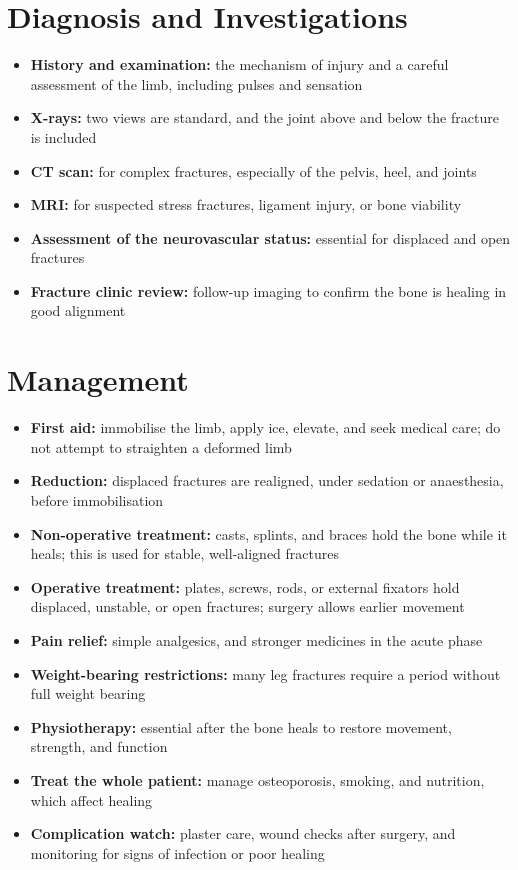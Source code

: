 \section*{Diagnosis and Investigations}
\begin{itemize}
    \item \textbf{History and examination:} the mechanism of injury and a careful assessment of the limb, including pulses and sensation
    \item \textbf{X-rays:} two views are standard, and the joint above and below the fracture is included
    \item \textbf{CT scan:} for complex fractures, especially of the pelvis, heel, and joints
    \item \textbf{MRI:} for suspected stress fractures, ligament injury, or bone viability
    \item \textbf{Assessment of the neurovascular status:} essential for displaced and open fractures
    \item \textbf{Fracture clinic review:} follow-up imaging to confirm the bone is healing in good alignment
\end{itemize}

\section*{Management}
\begin{itemize}
    \item \textbf{First aid:} immobilise the limb, apply ice, elevate, and seek medical care; do not attempt to straighten a deformed limb
    \item \textbf{Reduction:} displaced fractures are realigned, under sedation or anaesthesia, before immobilisation
    \item \textbf{Non-operative treatment:} casts, splints, and braces hold the bone while it heals; this is used for stable, well-aligned fractures
    \item \textbf{Operative treatment:} plates, screws, rods, or external fixators hold displaced, unstable, or open fractures; surgery allows earlier movement
    \item \textbf{Pain relief:} simple analgesics, and stronger medicines in the acute phase
    \item \textbf{Weight-bearing restrictions:} many leg fractures require a period without full weight bearing
    \item \textbf{Physiotherapy:} essential after the bone heals to restore movement, strength, and function
    \item \textbf{Treat the whole patient:} manage osteoporosis, smoking, and nutrition, which affect healing
    \item \textbf{Complication watch:} plaster care, wound checks after surgery, and monitoring for signs of infection or poor healing
\end{itemize}

